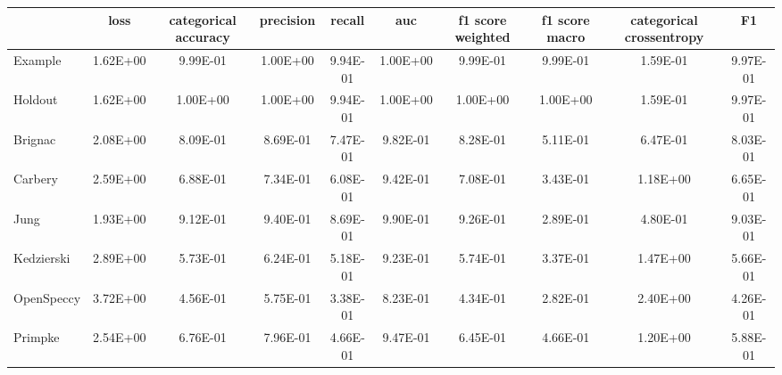 \begin{tabular}{lccccccccc}
\toprule
 & loss & categorical accuracy & precision & recall & auc & f1 score weighted & f1 score macro & categorical crossentropy & F1 \\
\midrule
Example & 1.62E+00 & 9.99E-01 & 1.00E+00 & 9.94E-01 & 1.00E+00 & 9.99E-01 & 9.99E-01 & 1.59E-01 & 9.97E-01 \\
Holdout & 1.62E+00 & 1.00E+00 & 1.00E+00 & 9.94E-01 & 1.00E+00 & 1.00E+00 & 1.00E+00 & 1.59E-01 & 9.97E-01 \\
Brignac & 2.08E+00 & 8.09E-01 & 8.69E-01 & 7.47E-01 & 9.82E-01 & 8.28E-01 & 5.11E-01 & 6.47E-01 & 8.03E-01 \\
Carbery & 2.59E+00 & 6.88E-01 & 7.34E-01 & 6.08E-01 & 9.42E-01 & 7.08E-01 & 3.43E-01 & 1.18E+00 & 6.65E-01 \\
Jung & 1.93E+00 & 9.12E-01 & 9.40E-01 & 8.69E-01 & 9.90E-01 & 9.26E-01 & 2.89E-01 & 4.80E-01 & 9.03E-01 \\
Kedzierski & 2.89E+00 & 5.73E-01 & 6.24E-01 & 5.18E-01 & 9.23E-01 & 5.74E-01 & 3.37E-01 & 1.47E+00 & 5.66E-01 \\
OpenSpeccy & 3.72E+00 & 4.56E-01 & 5.75E-01 & 3.38E-01 & 8.23E-01 & 4.34E-01 & 2.82E-01 & 2.40E+00 & 4.26E-01 \\
Primpke & 2.54E+00 & 6.76E-01 & 7.96E-01 & 4.66E-01 & 9.47E-01 & 6.45E-01 & 4.66E-01 & 1.20E+00 & 5.88E-01 \\
\bottomrule
\end{tabular}
